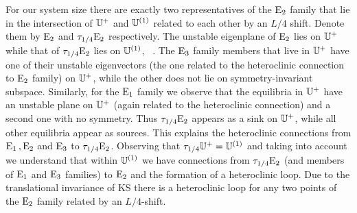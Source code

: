 For our system size
there are exactly two representatives
of the $\mathrm{E}_{2}$ family that lie in the intersection of $\mathbb{U}^+$ and $\mathbb{U}^{(1)}$ related
to each other by an $L/4$ shift. Denote them by $\mathrm{E}_{2}$ and $\tau_{1/4}\mathrm{E}_{2}$ respectively. The unstable eigenplane of
$\mathrm{E}_{2}$ lies on $\mathbb{U}^+$ while that of $\tau_{1/4}\mathrm{E}_{2}$ lies on $\mathbb{U}^{(1)}$, \cf\ .
The $\mathrm{E}_{3}$ family members that live in $\mathbb{U}^+$ have one of their unstable eigenvectors (the one related to the heteroclinic
connection to $\mathrm{E}_{2}$ family)  on $\mathbb{U}^+$, while the other does not lie on symmetry-invariant subspace.
Similarly, for the $\mathrm{E}_{1}$ family we observe that the equilibria in $\mathbb{U}^+$ have
an unstable plane on $\mathbb{U}^+$ (again related to the heteroclinic connection) and a second one with no symmetry.
Thus $\tau_{1/4}\mathrm{E}_{2}$ appears as a sink on $\mathbb{U}^+$, while all other equilibria appear as sources.
This explains the heteroclinic connections from $\mathrm{E}_{1}\,,\mathrm{E}_{2}$ and $\mathrm{E}_{3}$ to $\tau_{1/4}\mathrm{E}_{2}$.
Observing that $\tau_{1/4} \mathbb{U}^+= \mathbb{U}^{(1)}$ and taking into account  we understand that within $\mathbb{U}^{(1)}$
we have connections from $\tau_{1/4}\mathrm{E}_{2}$ (and members of $\mathrm{E}_{1}$ and $\mathrm{E}_{3}$ families) to $\mathrm{E}_{2}$ and the
formation of a heteroclinic loop. Due to the translational invariance of KS there is a heteroclinic loop for any two points
of the $\mathrm{E}_{2}$ family related by an $L/4$-shift.

